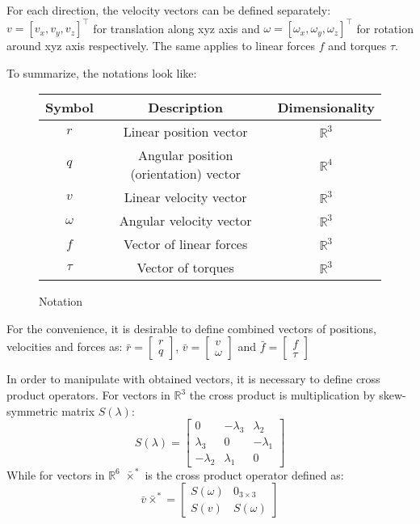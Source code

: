     For each direction, the velocity vectors can be defined separately: 
    $v = [v_x, v_y, v_z]^\top$ for translation along xyz axis and
    $\omega = [\omega_x, \omega_y, \omega_z]^\top$ for rotation around xyz axis respectively.
    The same applies to linear forces $f$ and torques $\tau$.

    To summarize, the notations look like:

    \begin{figure}[H]
    \begin{tabular}{ccc}
        \hline Symbol & Description & Dimensionality\\
        \hline
        $r$ & Linear position vector & $\mathbb{R}^{3}$ \\
        $q$ & Angular position (orientation) vector & $\mathbb{R}^{4}$\\
        $v$ & Linear velocity vector & $\mathbb{R}^{3}$\\
        $\omega$ & Angular velocity vector & $\mathbb{R}^{3}$\\
        $f$ & Vector of linear forces& $\mathbb{R}^{3}$ \\
        $\tau$ & Vector of torques& $\mathbb{R}^{3}$ \\
        \hline
        \end{tabular}
        \caption{Notation}
        \label{table:notation}
    \end{figure}

    For the convenience, it is desirable to define combined vectors of positions, velocities and forces as:
    $\bar{r} = \left[\begin{array}{ll}
        r \\
        q
    \end{array}\right]$, $\bar{v} = \left[\begin{array}{ll}
        v \\
        \omega
    \end{array}\right]$ and $\bar{f} = \left[\begin{array}{ll}
        f \\
        \tau
    \end{array}\right]$


    In order to manipulate with obtained vectors, it is necessary to define cross product operators.
    For vectors in $\mathbb{R}^{3}$ the cross product is multiplication by skew-symmetric matrix $S(\lambda)$:
    $$
    S(\lambda)=\left[\begin{array}{ccc}
        0 & -\lambda_3 & \lambda_2 \\
        \lambda_3 & 0 & -\lambda_1 \\
        -\lambda_2 & \lambda_1 & 0
    \end{array}\right]
    $$
    While for vectors in $\mathbb{R}^{6}$ $\bar{\times}^*$ is the cross product operator defined as:
    $$
    \bar{v}\bar{\times}^*=\left[\begin{array}{ll}
        S(\omega) & 0_{3 \times 3} \\
        S(v) & S(\omega)
    \end{array}\right]
    $$

